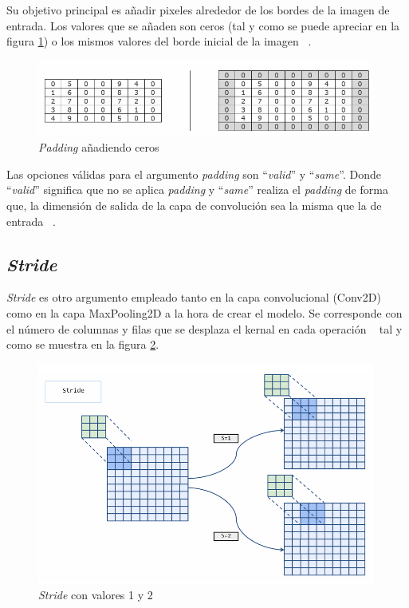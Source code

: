 Su objetivo principal es añadir pixeles alrededor de los bordes de la imagen de entrada. Los valores que se añaden son ceros (tal y como se puede apreciar en la figura \ref{fig:padding}) o los mismos valores del borde inicial de la imagen ~\cite{diego23}.

\begin{figure}[h]
    \centering
    \includegraphics[width=0.99\textwidth]{img/padding.PNG}
    \caption{\textit{Padding} añadiendo ceros ~\cite{diego23}}
    \label{fig:padding}
\end{figure}
\FloatBarrier

Las opciones válidas para el argumento \textit{padding} son ``\textit{valid}'' y ``\textit{same}''. Donde ``\textit{valid}'' significa que no se aplica \textit{padding} y ``\textit{same}'' realiza el \textit{padding} de forma que, la dimensión de salida de la capa de convolución sea la misma que la de entrada ~\cite{diego23}.

\subsection{\textit{Stride}}

\textit{Stride} es otro argumento empleado tanto en la capa convolucional (Conv2D) como en la capa MaxPooling2D a la hora de crear el modelo. Se corresponde con el número de columnas y filas que se desplaza el kernal en cada operación ~\cite{diego23} tal y como se muestra en la figura \ref{fig:stride}.

\begin{figure}[h]
    \centering
    \includegraphics[width=0.99\textwidth]{img/stride.PNG}
    \caption{\textit{Stride} con valores 1 y 2 ~\cite{diego23}}
    \label{fig:stride}
\end{figure}
\FloatBarrier

